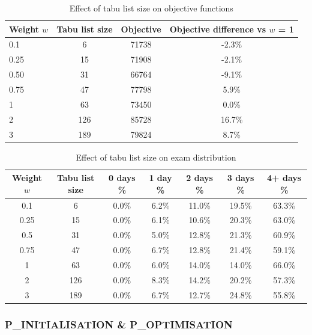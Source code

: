 \begin{table}[h]
	\caption{Effect of tabu list size on objective functions}
	\label{tab:tuning_tabu_obj}
	\centering
	\begin{tabular}{l c c c }
		\hline
  	\textbf{Weight $w$}	                & 
     	\textbf{Tabu list size}	                & 
    \textbf{Objective} & 
    \textbf{Objective difference vs $w$ = 1} \\ \hline
        0.1 & 6 & 71738 & -2.3\%  \\ 
        0.25& 15 & 71908 & -2.1\%  \\ 
        0.50 & 31 & 66764 & -9.1\%  \\ 
        0.75 & 47 & 77798 & 5.9\% \\
        1 & 63 &73450 & 0.0\% \\
        2 & 126 & 85728 & 16.7\% \\
        3 & 189 & 79824 & 8.7\% \\
        \hline
	\end{tabular}
\end{table}

\begin{table}[h]
	\caption{Effect of tabu list size on exam distribution}
	\label{tab:tuning_tabu_distr}
	\centering
	\begin{tabular}{c c c c c c c}
		\hline
  	\textbf{Weight $w$}	&
   \textbf{Tabu list size} &
   \textbf{0 days \% } &
    \textbf{1 day \% } & 
    \textbf{2 days \% } &
    \textbf{3 days \% } & 
    \textbf{4+ days \%}\\ \hline
    0.1 & 6 & 0.0\% & 6.2\% & 11.0\% & 19.5\% & 63.3\% \\
    0.25 & 15 & 0.0\% & 6.1\% & 10.6\% & 20.3\% & 63.0\% \\
    0.5 & 31 & 0.0\% & 5.0\% & 12.8\% & 21.3\% & 60.9\% \\
    0.75 & 47 & 0.0\% & 6.7\% & 12.8\% & 21.4\% & 59.1\% \\
    1 & 63 & 0.0\% & 6.0\% & 14.0\% & 14.0\% & 66.0\% \\
    2 &  126 & 0.0\% & 8.3\% & 14.2\% & 20.2\% & 57.3\% \\
    3 &  189 & 0.0\% & 6.7\% & 12.7\% & 24.8\% & 55.8\% \\
        \hline
	\end{tabular}
\end{table}

\subsubsection{P\_INITIALISATION \& P\_OPTIMISATION}


